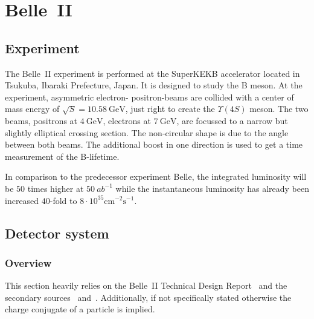 \chapter{Belle~\RN{2}}
\label{chap:belle2_experiment}

\section{Experiment}
\label{sec:experimental}

The Belle~\RN{2} experiment is performed at the SuperKEKB accelerator located in Tsukuba, Ibaraki Prefecture, Japan. It is designed to study the B meson.
At the experiment, asymmetric electron- positron-beams are collided with a center of mass energy of $\sqrt{S} = 10.58 \mathrm{~GeV}$, just right to create the $\Upsilon (4S)$ meson. The two beams, positrons at $4 \mathrm{~GeV}$, electrons at $7 \mathrm{~GeV}$, are focussed to a narrow but slightly elliptical crossing section. The non-circular shape is due to the angle between both beams. The additional boost in one direction is used to get a time measurement of the B-lifetime.

In comparison to the predecessor experiment Belle, the integrated luminosity will be $50$ times higher at $50~{ab}^{-1}$ while the instantaneous luminosity has already been increased $40$-fold to $8 \cdot 10^{35} \mathrm{cm}^{-2} \mathrm{s}^{-1}$.

\section{Detector system}
\label{sec:detector_system}

\subsection{Overview}
\label{subsec:detector_system_overview}

This section heavily relies on the Belle~\RN{2} Technical Design Report~\cite{Abe:2010gxa} and the secondary sources~\cite{Pulvermacher:SuperKEKBDetectorComponents} and~\cite{Pulvermacher:AnalysisSoftware}. Additionally, if not specifically stated otherwise the charge conjugate of a particle is implied.


